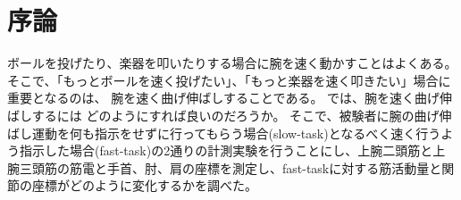 \documentclass{jsarticle}
\begin{document}
\section{序論}
ボールを投げたり、楽器を叩いたりする場合に腕を速く動かすことはよくある。そこで、「もっとボールを速く投げたい」、「もっと楽器を速く叩きたい」場合に重要となるのは、
腕を速く曲げ伸ばしすることである。
では、腕を速く曲げ伸ばしするには
どのようにすれば良いのだろうか。
そこで、被験者に腕の曲げ伸ばし運動を何も指示をせずに行ってもらう場合(slow-task)となるべく速く行うよう指示した場合(fast-task)の2通りの計測実験を行うことにし、上腕二頭筋と上腕三頭筋の筋電と手首、肘、肩の座標を測定し、fast-taskに対する筋活動量と関節の座標がどのように変化するかを調べた。
\end{document}

